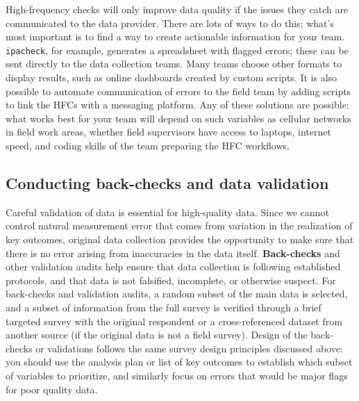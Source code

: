 High-frequency checks will only improve data quality
if the issues they catch are communicated to the data provider.
There are lots of ways to do this;
what's most important is to find a way to create actionable information for your team.
\texttt{ipacheck}, for example, generates a spreadsheet with flagged errors;
these can be sent directly to the data collection teams.
Many teams choose other formats to display results,
such as online dashboards created by custom scripts.
It is also possible to automate communication of errors to the field team
by adding scripts to link the HFCs with a messaging platform.
Any of these solutions are possible:
what works best for your team will depend on such variables as
cellular networks in field work areas, whether field supervisors have access to laptops,
internet speed, and coding skills of the team preparing the HFC workflows.

\subsection{Conducting back-checks and data validation}

Careful validation of data is essential for high-quality data.
Since we cannot control natural measurement error
that comes from variation in the realization of key outcomes,
original data collection provides the opportunity to make sure
that there is no error arising from inaccuracies in the data itself.
\textbf{Back-checks} and
other validation audits help ensure that data collection is following established protocols,
and that data is not falsified, incomplete, or otherwise suspect.
For back-checks and validation audits, a random subset of the main data is selected,
and a subset of information from the full survey is
verified through a brief targeted survey with the original respondent
or a cross-referenced dataset from another source (if the original data is not a field survey).
Design of the back-checks or validations follows the same survey design
principles discussed above: you should use the analysis plan
or list of key outcomes to establish which subset of variables to prioritize,
and similarly focus on errors that would be major flags for poor quality data.

